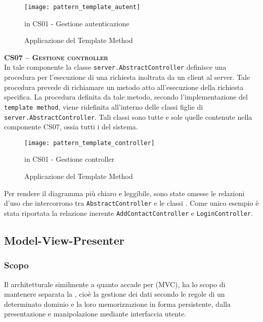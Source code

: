 \begin{description}
\begin{figure}[H]
  \centering
  \texttt{[image: pattern\_template\_autent]}
  \caption{Applicazione del  Template Method}in \textsf{CS01 - Gestione autenticazione} \label{fig:template_autent}
\end{figure}


	\item{\scshape\bfseries CS07 -- Gestione controller}\\
In tale componente la classe \texttt{server.AbstractController} definisce una procedura per l'esecuzione di una richiesta inoltrata da un client al server. Tale procedura prevede di richiamare un metodo atto all'esecuzione della richiesta specifica. La procedura definita da tale metodo, secondo l'implementazione del \texttt{template method}, viene ridefinita all'interno delle classi figlie di \texttt{server.AbstractController}. Tali classi sono tutte e sole quelle contenute nella componente CS07, ossia tutti i  del sistema.

\begin{figure}[H]
  \centering
  \texttt{[image: pattern\_template\_controller]}
  \caption{Applicazione del  Template Method}in \textsf{CS01 - Gestione controller} \label{fig:template_controller}
\end{figure}



Per rendere il diagramma più chiaro e leggibile, sono state omesse le relazioni d'uso che intercorrono tra \texttt{AbstractController} e le classi . Come unico esempio è stata riportata la relazione inerente \texttt{AddContactController} e \texttt{LoginController}.

\end{description}

\subsection{Model-View-Presenter}\label{sec:MVP}

\subsubsection{Scopo}
Il  architetturale  similmente a quanto accade per  (MVC), ha lo scopo di mantenere separata la , cioè la gestione dei dati secondo le regole di un determinato dominio e la loro memorizzazione in forma persistente, dalla presentazione e manipolazione mediante interfaccia utente.


